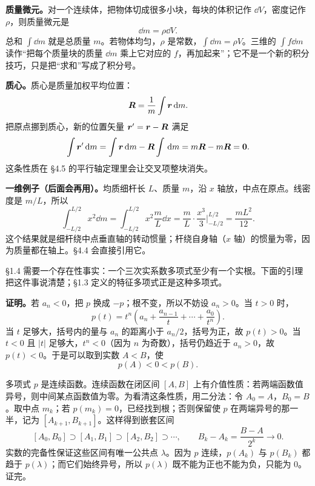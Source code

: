 \documentclass[11pt]{ctexart}
\let\origsubhdr\subhdr
\renewcommand{\subhdr}[1]{\par\needspace{3\baselineskip}\origsubhdr{#1}}
\begin{document}
\textbf{质量微元。}对一个连续体，把物体切成很多小块，每块的体积记作 $\dd V$，密度记作 $\rho$，则质量微元是
\[
\dd m=\rho\dd V .
\]
总和 $\int\dd m$ 就是总质量 $m$。若物体均匀，$\rho$ 是常数，$\int\dd m=\rho V$。三维的 $\int f\dd m$ 读作“把每个质量块的质量 $\dd m$ 乘上它对应的 $f$，再加起来”；它不是一个新的积分技巧，只是把“求和”写成了积分号。

\textbf{质心。}质心是质量加权平均位置：
\[
\boldsymbol{R}=\frac{1}{m}\int\boldsymbol{r}\,\mathrm{d} m .
\]
把原点挪到质心，新的位置矢量 $\boldsymbol{r}'=\boldsymbol{r}-\boldsymbol{R}$ 满足
\[
\int\boldsymbol{r}'\,\mathrm{d} m=\int\boldsymbol{r}\,\mathrm{d} m-\boldsymbol{R}\int\,\mathrm{d} m=m\boldsymbol{R}-m\boldsymbol{R}=\boldsymbol{0} .
\]
这条性质在 \S4.5 的平行轴定理里会让交叉项整块消失。

\textbf{一维例子（后面会再用）。}均质细杆长 $L$、质量 $m$，沿 $x$ 轴放，中点在原点。线密度是 $m/L$，所以
\[
\int_{-L/2}^{L/2}x^2\dd m
=\int_{-L/2}^{L/2}x^2\frac{m}{L}\dd x
=\frac{m}{L}\cdot\frac{x^3}{3}\Big|_{-L/2}^{L/2}
=\frac{mL^2}{12}.
\]
这个结果就是细杆绕中点垂直轴的转动惯量；杆绕自身轴（$x$ 轴）的惯量为零，因为质量都在轴上。\S4.4 会直接引用它。

\label{subsec:realroot}

\S1.4 需要一个存在性事实：一个三次实系数多项式至少有一个实根。下面的引理把这件事说清楚；\S1.3 定义的特征多项式正是这种多项式。

\begin{center}
\end{center}

\textbf{证明。}若 $a_n<0$，把 $p$ 换成 $-p$；根不变，所以不妨设 $a_n>0$。当 $t>0$ 时，
\[
p(t)=t^n\left(a_n+\frac{a_{n-1}}{t}+\cdots+\frac{a_0}{t^n}\right).
\]
当 $t$ 足够大，括号内的量与 $a_n$ 的距离小于 $a_n/2$，括号为正，故 $p(t)>0$。当 $t<0$ 且 $|t|$ 足够大，$t^n<0$（因为 $n$ 为奇数），括号仍趋近于 $a_n>0$，故 $p(t)<0$。于是可以取到实数 $A<B$，使
\[
p(A)<0<p(B).
\]

多项式 $p$ 是连续函数。连续函数在闭区间 $[A,B]$ 上有介值性质：若两端函数值异号，则中间某点函数值为零。为看清这条性质，用二分法：令 $A_0=A$，$B_0=B$。取中点 $m_k$；若 $p(m_k)=0$，已经找到根；否则保留使 $p$ 在两端异号的那一半，记为 $[A_{k+1},B_{k+1}]$。这样得到嵌套区间
\[
[A_0,B_0]\supset[A_1,B_1]\supset[A_2,B_2]\supset\cdots,
\qquad
B_k-A_k=\frac{B-A}{2^k}\to0 .
\]
实数的完备性保证这些区间有唯一公共点 $\lambda$。因为 $p$ 连续，$p(A_k)$ 与 $p(B_k)$ 都趋于 $p(\lambda)$；而它们始终异号，所以 $p(\lambda)$ 既不能为正也不能为负，只能为 $0$。证完。
\end{document}
